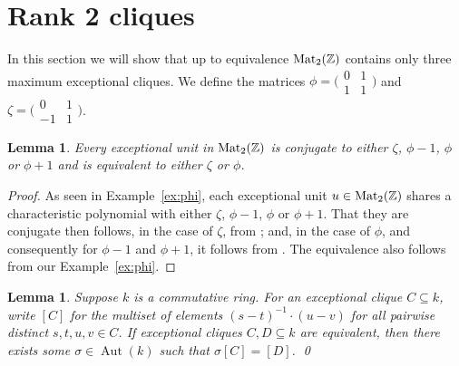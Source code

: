\documentclass{amsart}
\theoremstyle{plain}
\newtheorem{lemma}[theorem]{Lemma}
\newtheorem{proposition}[theorem]{Proposition}
\theoremstyle{definition}
\DeclareMathOperator{\Aut}{Aut}
\newcommand{\Z}{\ensuremath{\mathbb{Z}}}
\newcommand{\F}{\ensuremath{\mathbb{F}}}
\newcommand{\clq}{C}
\newcommand{\clqb}{D}
\newcommand{\crg}{k}
\begin{document}

\section{Rank 2 cliques}\label{sec:rank_2}

In this section we will show that up to equivalence \(\textup{Mat}_2(\Z)\) contains only three maximum exceptional cliques.
We define the matrices \(\phi=\big(\begin{smallmatrix}0&1\\1&1\end{smallmatrix}\big)\) and \(\zeta=\big(\begin{smallmatrix}0&1\\-1&1\end{smallmatrix}\big)\).

\begin{lemma}\label{lem:integer_conjugacy}
	Every exceptional unit in \(\textup{Mat}_2(\Z)\) is conjugate to either \(\zeta\), \(\phi-1\), \(\phi\) or \(\phi+1\) and is equivalent to either \(\zeta\) or \(\phi\).
\end{lemma}
\begin{proof}
	As seen in Example~\ref{ex:phi}, each exceptional unit \(u\in\textup{Mat}_2(\Z)\) shares a characteristic polynomial with either \(\zeta\), \(\phi-1\), \(\phi\) or \(\phi+1\). That they are  conjugate then follows, in the case of \(\zeta\), from \cite[Theorem 11.2]{matrix_conjugacy}; and, in the case of \(\phi\), and consequently for \(\phi-1\) and \(\phi+1\), it follows from \cite[ Example~9.10, Corollary~10.10 and Theorem~11.8]{matrix_conjugacy}. The equivalence also follows from our Example~\ref{ex:phi}.
\end{proof}

\begin{lemma}\label{lem:test_clique_equivalence}
	Suppose \(\crg\) is a commutative ring. 
	For an exceptional clique \(\clq\subseteq \crg\), write \([\clq]\) for the multiset of elements \((s-t)^{-1}\cdot (u-v)\) for all pairwise distinct \(s,t,u,v\in \clq\).
	If exceptional cliques \(\clq,\clqb\subseteq \crg\) are equivalent, then there exists some \(\sigma\in\Aut(\crg)\) such that \(\sigma[\clq]=[\clqb]\). \qed
\end{lemma}
\end{document}

